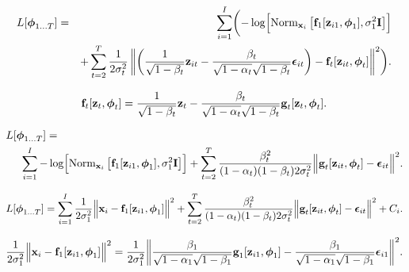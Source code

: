 \documentclass[letterpaper,twoside,openany, titlepage,oldfontcommands,titles,dvipsnames]{memoir}
\begin{document}
\begin{eqnarray}\label{eq:diffusion_loss_function_2}
 L[\boldsymbol\phi_{1\ldots T}] &=& \sum_{i=1}^{I}\biggl(-\log\Bigl[\mbox{Norm}_{\mathbf{x}_i}\left[\mbox{\bf f}_{1}[\mathbf{z}_{i1},\boldsymbol\phi_{1}],\sigma_{1}^{2}\mathbf{I}\right]\Bigr]\\
 &&\vspace{-2.0cm}
  + \sum_{t=2}^{T}\frac{1}{2\sigma_{t}^{2}}\left\lVert 
  \left(\frac{1}{\sqrt{1-\beta_{t}}} \mathbf{z}_{it} - \frac{\beta_{t}}{\sqrt{1-\alpha_{t}}\sqrt{1-\beta_{t}}}\boldsymbol\epsilon_{it}\right)-\mbox{\bf f}_{t}[\mathbf{z}_{it},\boldsymbol\phi_{t}] \right\rVert^2\biggr).\nonumber
 \end{eqnarray}


\begin{eqnarray}\label{eq:diffusion_f_reparam}
  \mbox{\bf f}_{t}[\mathbf{z}_{t},\boldsymbol\phi_{t}] = \frac{1}{\sqrt{1-\beta_{t}}} \mathbf{z}_t - \frac{\beta_{t}}{\sqrt{1-\alpha_{t}}\sqrt{1-\beta_{t}}}\mbox{\bf g}_t[\mathbf{z}_{t},\boldsymbol\phi_t].
 \end{eqnarray}

\begin{eqnarray}\label{eq:diffusion_loss_function_3}
 L[\boldsymbol\phi_{1\ldots T}] =\\
 &&\hspace{-1.5cm}\sum_{i=1}^{I}-\log\Bigl[\mbox{Norm}_{\mathbf{x}_i}\left[\mbox{\bf f}_{1}[\mathbf{z}_{i1},\boldsymbol\phi_{1}],\sigma_{1}^{2}\mathbf{I}\right]\Bigr] + \sum_{t=2}^{T}\frac{\beta_t^2}{(1-\alpha_{t})(1-\beta_{t})2\sigma_{t}^{2}}\Big\lVert\mbox{\bf g}_{t}[\mathbf{z}_{it},\boldsymbol\phi_{t}]-\boldsymbol\epsilon_{it}\Big\rVert^2.\nonumber 
 \end{eqnarray}

\begin{eqnarray}
 L[\boldsymbol\phi_{1\ldots T}] = \sum_{i=1}^{I}\frac{1}{2\sigma_1^2}\Big\lVert\mathbf{x}_i-\mbox{\bf f}_{1}[\mathbf{z}_{i1},\boldsymbol\phi_{1}]\Bigr\rVert^2 + \sum_{t=2}^{T}\frac{\beta_t^2}{(1-\alpha_{t})(1-\beta_{t})2\sigma_{t}^{2}}\Big\lVert\mbox{\bf g}_{t}[\mathbf{z}_{it},\boldsymbol\phi_{t}]-\boldsymbol\epsilon_{it}\Big\rVert^2+C_i.
 \end{eqnarray}

\begin{eqnarray}\label{eq:diffusion_ls_term}
  \frac{1}{2\sigma_1^2}\Big\lVert\mathbf{x}_i-\mbox{\bf f}_{1}[\mathbf{z}_{i1},\boldsymbol\phi_{1}]\Bigr\rVert^2 = \frac{1}{2\sigma_1^2}\biggl\lVert \frac{\beta_{1}}{\sqrt{1-\alpha_{1}}\sqrt{1-\beta_{1}}}\mbox{\bf g}_1[\mathbf{z}_{i1},\boldsymbol\phi_1]- \frac{\beta_{1}}{\sqrt{1-\alpha_{1}}\sqrt{1-\beta_{1}}}\boldsymbol\epsilon_{i1}\bigg\rVert^2.
 \end{eqnarray}
\end{document}
